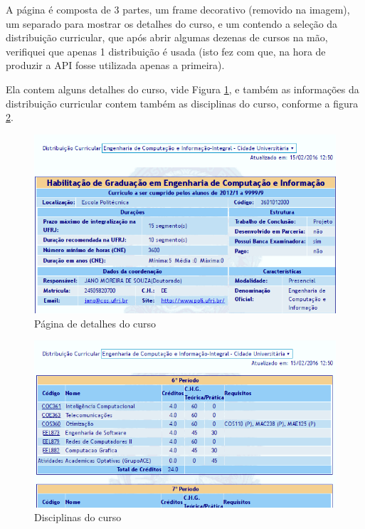 A página é composta de 3 partes, um frame decorativo (removido na imagem), um separado para mostrar os detalhes do curso, e um contendo a seleção da distribuição curricular, que após abrir algumas dezenas de cursos na mão, verifiquei que apenas 1 distribuição é usada (isto fez com que, na hora de produzir a API fosse utilizada apenas a primeira).

Ela contem alguns detalhes do curso, vide Figura \ref{fig:curso}, e também as informações da distribuição curricular contem também as disciplinas do curso, conforme a figura \ref{fig:curso_periodos}.

\begin{figure}[H]
\centering
	\includegraphics[width=\textwidth]{curso.png}
\caption{Página de detalhes do curso}
\label{fig:curso}
\end{figure}

\begin{figure}[H]
\centering
	\includegraphics[width=\textwidth]{curso_periodos.png}
\caption{Disciplinas do curso}
\label{fig:curso_periodos}
\end{figure}

